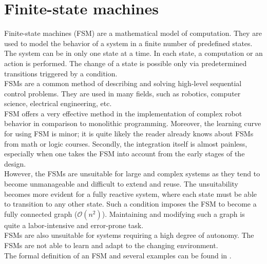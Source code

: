 \section{Finite-state machines}
    Finite-state machines (FSM) are a mathematical model of computation. They are used to model the behavior of a system in a finite number of predefined states. The system can be in only one state at a time. In each state, a computation or an action is performed. The change of a state is possible only via predetermined transitions triggered by a condition.\\
    FSMs are a common method of describing and solving high-level sequential control problems. They are used in many fields, such as robotics, computer science, electrical engineering, etc.\\
    FSM offers a very effective method in the implementation of complex robot behavior in comparison to monolithic programming.\cite{FSM_safety} Moreover, the learning curve for using FSM is minor; it is quite likely the reader already knows about FSMs from math or logic courses. Secondly, the integration itself is almost painless, especially when one takes the FSM into account from the early stages of the design.\cite{FSM_intro}\\
    However, the FSMs are unsuitable for large and complex systems as they tend to become unmanageable and difficult to extend and reuse. The unsuitability becomes more evident for a fully reactive system, where each state must be able to transition to any other state. Such a condition imposes the FSM to become a fully connected graph ($\mathcal{O}(n^2)$). Maintaining and modifying such a graph is quite a labor-intensive and error-prone task.\\
    FSMs are also unsuitable for systems requiring a high degree of autonomy. The FSMs are not able to learn and adapt to the changing environment.\\
    The formal definition of an FSM and several examples can be found in \cite{FSM_intro}.

